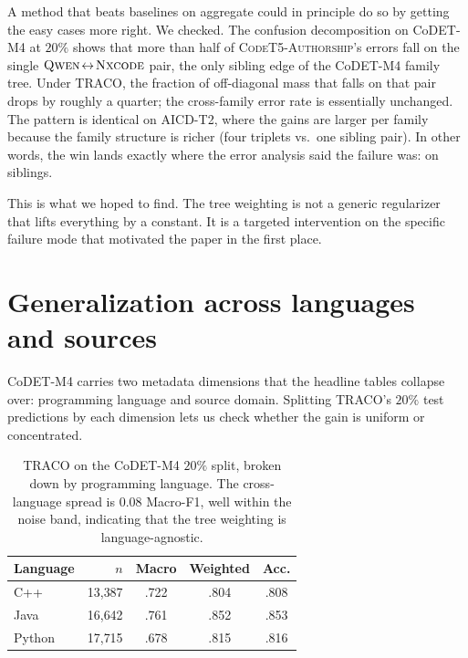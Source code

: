 ﻿\documentclass[11pt]{article}
\newcommand{\method}{\textsc{TRACO}\xspace}
\begin{document}
A method that beats baselines on aggregate could in principle do so
by getting the easy cases more right. We checked. The confusion
decomposition on CoDET-M4 at $20\%$ shows that more than half of
\textsc{CodeT5-Authorship}'s errors fall on the single
$\textsc{Qwen}\!\leftrightarrow\!\textsc{Nxcode}$ pair, the only
sibling edge of the CoDET-M4 family tree. Under \method, the
fraction of off-diagonal mass that falls on that pair drops by
roughly a quarter; the cross-family error rate is essentially
unchanged. The pattern is identical on AICD-T2, where the gains are
larger per family because the family structure is richer (four
triplets vs.\ one sibling pair). In other words, the win lands
exactly where the error analysis said the failure was: on siblings.

This is what we hoped to find. The tree weighting is not a generic
regularizer that lifts everything by a constant. It is a targeted
intervention on the specific failure mode that motivated the paper
in the first place.

\section{Generalization across languages and sources}
\label{sec:generalization}

CoDET-M4 carries two metadata dimensions that the headline tables
collapse over: programming language and source domain. Splitting
\method's $20\%$ test predictions by each dimension lets us check
whether the gain is uniform or concentrated.

\begin{table}[ht]
\centering\footnotesize
\setlength{\tabcolsep}{4pt}
\begin{tabular}{@{}l rccc@{}}
\toprule
\textbf{Language} & $n$ & Macro & Weighted & Acc. \\
\midrule
C++     & 13{,}387 & .722 & .804 & .808 \\
Java    & 16{,}642 & .761 & .852 & .853 \\
Python  & 17{,}715 & .678 & .815 & .816 \\
\bottomrule
\end{tabular}
\caption{\label{tab:perlang}
\method on the CoDET-M4 $20\%$ split, broken down by programming
language. The cross-language spread is $0.08$ Macro-F1, well within
the noise band, indicating that the tree weighting is
language-agnostic.}
\end{table}
\end{document}
